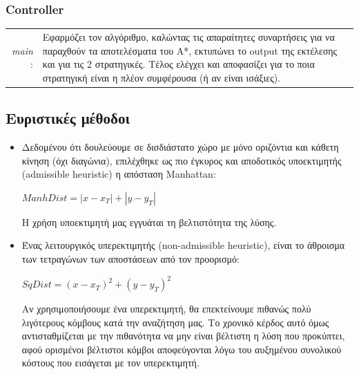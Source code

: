 \documentclass[a4paper,9pt]{article}
\begin{document}
\subsubsection{Controller}
\begin{tabular}{r l}
    \emph{main} :&Εφαρμόζει τον αλγόριθμο, καλώντας τις απαραίτητες
	συναρτήσεις για να παραχθούν τα αποτελέσματα του A*, εκτυπώνει το output
	της εκτέλεσης και για τις 2 στρατηγικές. Τέλος ελέγχει και αποφασίζει για
	το ποια στρατηγική είναι η πλέον συμφέρουσα (ή αν είναι ισάξιες).\\
\end{tabular}


\subsection{Ευριστικές μέθοδοι}
\begin{itemize}
    \item
        Δεδομένου ότι δουλεύουμε σε δισδιάστατο χώρο με μόνο οριζόντια και κάθετη
        κίνηση (όχι διαγώνια), επιλέχθηκε ως πιο έγκυρος και αποδοτικός υποεκτιμητής
        (admissible heuristic) η απόσταση Manhattan:
        \begin{center} $ManhDist = |x - x_T| + |y - y_T|$ \end{center}
        Η χρήση υποεκτιμητή μας εγγυάται τη βελτιστότητα της λύσης.

    \item
        Ένας λειτουργικός υπερεκτιμητής (non-admissible heuristic), είναι το άθροισμα
        των τετραγώνων των αποστάσεων από τον προορισμό:
        \begin{center} $SqDist = (x - x_T)^2 + (y - y_T)^2$ \end{center}
        Αν χρησιμοποιήσουμε ένα υπερεκτιμητή, θα επεκτείνουμε πιθανώς πολύ λιγότερους
        κόμβους κατά την αναζήτηση μας. Το χρονικό κέρδος αυτό όμως αντισταθμίζεται με
        την πιθανότητα να μην είναι βέλτιστη η λύση που προκύπτει, αφού ορισμένοι
        βέλτιστοι κόμβοι αποφεύγονται λόγω του αυξημένου συνολικού κόστους που
        εισάγεται με τον υπερεκτιμητή.
\end{itemize}


\end{document}
